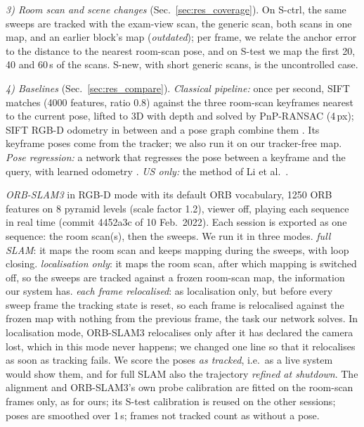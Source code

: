 \documentclass[9pt,shortpaper,twoside,web]{ieeecolor2}
\newcommand{\Stest}{S-test}
\newcommand{\Snew}{S-new}
\newcommand{\Sctrl}{S-ctrl}
\newcommand{\fullslam}{\emph{full SLAM}}
\newcommand{\loconly}{\emph{localisation only}}
\newcommand{\reloc}{\emph{each frame relocalised}}
\begin{document}
\emph{3) Room scan and scene changes} (Sec.~\ref{sec:res_coverage}). On \Sctrl{}, the same sweeps are tracked with the exam-view scan, the generic scan, both scans in one map, and an earlier block's map (\emph{outdated}); per frame, we relate the anchor error to the distance to the nearest room-scan pose, and on \Stest{} we map the first 20, 40 and 60\,s of the scans. \Snew{}, with short generic scans, is the uncontrolled case.

\emph{4) Baselines} (Sec.~\ref{sec:res_compare}). \emph{Classical pipeline:} once per second, SIFT \cite{lowe2004sift} matches (4000 features, ratio 0.8) against the three room-scan keyframes nearest to the current pose, lifted to 3D with depth and solved by PnP-RANSAC \cite{lepetit2009epnp} (4\,px); SIFT RGB-D odometry in between and a pose graph combine them \cite{TODO-classical-pipeline}. Its keyframe poses come from the tracker; we also run it on our tracker-free map. \emph{Pose regression:} a network that regresses the pose between a keyframe and the query, with learned odometry \cite{TODO-own-pose-regression}. \emph{US only:} the method of Li et al.\ \cite{li2024longterm}.

\emph{ORB-SLAM3} \cite{campos2021orbslam3} in RGB-D mode with its default ORB vocabulary, 1250 ORB features on 8 pyramid levels (scale factor 1.2), viewer off, playing each sequence in real time (commit 4452a3c of 10 Feb.\ 2022). Each session is exported as one sequence: the room scan(s), then the sweeps. We run it in three modes. \fullslam{}: it maps the room scan and keeps mapping during the sweeps, with loop closing. \loconly{}: it maps the room scan, after which mapping is switched off, so the sweeps are tracked against a frozen room-scan map, the information our system has. \reloc{}: as localisation only, but before every sweep frame the tracking state is reset, so each frame is relocalised against the frozen map with nothing from the previous frame, the task our network solves. In localisation mode, ORB-SLAM3 relocalises only after it has declared the camera lost, which in this mode never happens; we changed one line so that it relocalises as soon as tracking fails. We score the poses \emph{as tracked}, i.e.\ as a live system would show them, and for full SLAM also the trajectory \emph{refined at shutdown}. The alignment and ORB-SLAM3's own probe calibration are fitted on the room-scan frames only, as for ours; its \Stest{} calibration is reused on the other sessions; poses are smoothed over 1\,s; frames not tracked count as without a pose.
\end{document}
